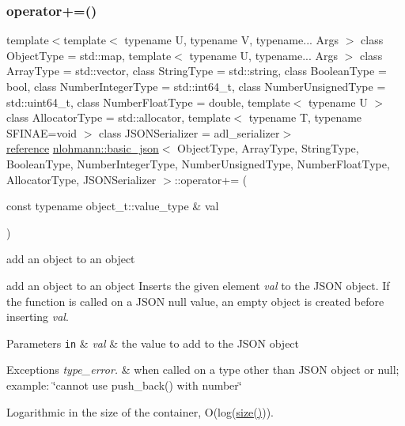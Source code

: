 \subsubsection{\texorpdfstring{operator+=()}{operator+=()}\hspace{0.1cm}{\footnotesize\ttfamily [3/4]}}
{\footnotesize\ttfamily template$<$template$<$ typename U, typename V, typename... Args $>$ class Object\+Type = std\+::map, template$<$ typename U, typename... Args $>$ class Array\+Type = std\+::vector, class String\+Type  = std\+::string, class Boolean\+Type  = bool, class Number\+Integer\+Type  = std\+::int64\+\_\+t, class Number\+Unsigned\+Type  = std\+::uint64\+\_\+t, class Number\+Float\+Type  = double, template$<$ typename U $>$ class Allocator\+Type = std\+::allocator, template$<$ typename T, typename S\+F\+I\+N\+A\+E=void $>$ class J\+S\+O\+N\+Serializer = adl\+\_\+serializer$>$ \\
\mbox{\hyperlink{classnlohmann_1_1basic__json_ac6a5eddd156c776ac75ff54cfe54a5bc}{reference}} \mbox{\hyperlink{classnlohmann_1_1basic__json}{nlohmann\+::basic\+\_\+json}}$<$ Object\+Type, Array\+Type, String\+Type, Boolean\+Type, Number\+Integer\+Type, Number\+Unsigned\+Type, Number\+Float\+Type, Allocator\+Type, J\+S\+O\+N\+Serializer $>$\+::operator+= (\begin{DoxyParamCaption}\item[{const typename object\+\_\+t\+::value\+\_\+type \&}]{val }\end{DoxyParamCaption})\hspace{0.3cm}{\ttfamily [inline]}}



add an object to an object 

add an object to an object Inserts the given element {\itshape val} to the J\+S\+ON object. If the function is called on a J\+S\+ON null value, an empty object is created before inserting {\itshape val}.


\begin{DoxyParams}[1]{Parameters}
\mbox{\tt in}  & {\em val} & the value to add to the J\+S\+ON object\\
\hline
\end{DoxyParams}

\begin{DoxyExceptions}{Exceptions}
{\em type\+\_\+error.} & when called on a type other than J\+S\+ON object or null; example\+: {\ttfamily \char`\"{}cannot use push\+\_\+back() with number\char`\"{}}\\
\hline
\end{DoxyExceptions}
Logarithmic in the size of the container, O(log({\ttfamily \mbox{\hyperlink{classnlohmann_1_1basic__json_a25e27ad0c6d53c01871c5485e1f75b96}{size()}}})).

